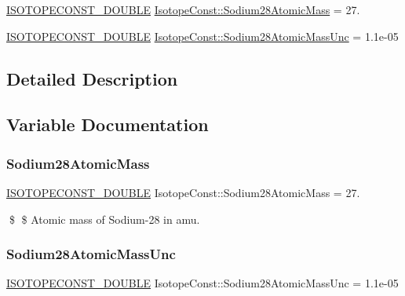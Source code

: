 \begin{DoxyCompactItemize}
\item 
\mbox{\hyperlink{group___isotope_const-_macros_ga8f45a7272ce02c0b4c65c44636ed719a}{I\+S\+O\+T\+O\+P\+E\+C\+O\+N\+S\+T\+\_\+\+D\+O\+U\+B\+LE}} \mbox{\hyperlink{group___isotope_const-_sodium-_na28_ga14067193c90f0c79d587f6af8878e354}{Isotope\+Const\+::\+Sodium28\+Atomic\+Mass}} = 27.
\item 
\mbox{\hyperlink{group___isotope_const-_macros_ga8f45a7272ce02c0b4c65c44636ed719a}{I\+S\+O\+T\+O\+P\+E\+C\+O\+N\+S\+T\+\_\+\+D\+O\+U\+B\+LE}} \mbox{\hyperlink{group___isotope_const-_sodium-_na28_ga02c825edb01cbc0a4fec639b5a047976}{Isotope\+Const\+::\+Sodium28\+Atomic\+Mass\+Unc}} = 1.\+1e-\/05
\end{DoxyCompactItemize}


\subsection{Detailed Description}


\subsection{Variable Documentation}
\mbox{\label{group___isotope_const-_sodium-_na28_ga14067193c90f0c79d587f6af8878e354}} 
\subsubsection{\texorpdfstring{Sodium28\+Atomic\+Mass}{Sodium28AtomicMass}}
{\footnotesize\ttfamily \mbox{\hyperlink{group___isotope_const-_macros_ga8f45a7272ce02c0b4c65c44636ed719a}{I\+S\+O\+T\+O\+P\+E\+C\+O\+N\+S\+T\+\_\+\+D\+O\+U\+B\+LE}} Isotope\+Const\+::\+Sodium28\+Atomic\+Mass = 27.}

\$ \$ Atomic mass of Sodium-\/28 in amu. \mbox{\label{group___isotope_const-_sodium-_na28_ga02c825edb01cbc0a4fec639b5a047976}} 
\subsubsection{\texorpdfstring{Sodium28\+Atomic\+Mass\+Unc}{Sodium28AtomicMassUnc}}
{\footnotesize\ttfamily \mbox{\hyperlink{group___isotope_const-_macros_ga8f45a7272ce02c0b4c65c44636ed719a}{I\+S\+O\+T\+O\+P\+E\+C\+O\+N\+S\+T\+\_\+\+D\+O\+U\+B\+LE}} Isotope\+Const\+::\+Sodium28\+Atomic\+Mass\+Unc = 1.\+1e-\/05}

